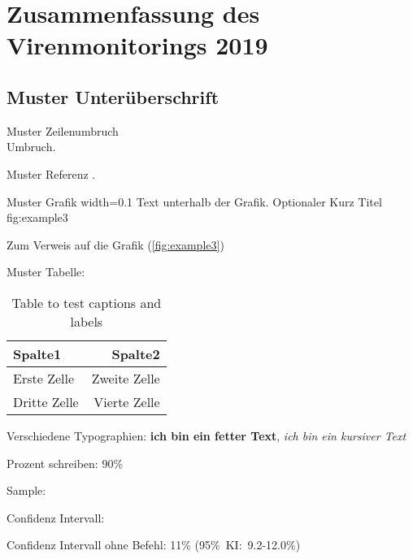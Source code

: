 
\section{Zusammenfassung des Virenmonitorings 2019}

\subsection{Muster Unterüberschrift}

Muster Zeilenumbruch \\ Umbruch.

Muster Referenz \citep{morawetzHealthStatusHoney2019}.

Muster Grafik
  {width=0.1\textwidth} %
  {Text unterhalb der Grafik.} %
  {Optionaler Kurz Titel} %
  {fig:example3} %
  
Zum Verweis auf die Grafik (\cref{fig:example3})
  
Muster Tabelle:

\begin{table}[htp]
    \centering
    \begin{tabular}{|l|r|} 
      \hline
      Spalte1 & Spalte2 \\
      \hline
      Erste Zelle & Zweite Zelle \\
      \hline
      Dritte Zelle & Vierte Zelle \\
      \hline
    \end{tabular}
    \caption{Table to test captions and labels}
    \label{tab:example3}
\end{table}

Verschiedene Typographien: \textbf{ich bin ein fetter Text}, \textit{ich bin ein kursiver Text}

Prozent schreiben: 90\%

Sample: 

Confidenz Intervall:  %

Confidenz Intervall ohne Befehl: 11\% (95\%~KI:~9.2-12.0\%)
